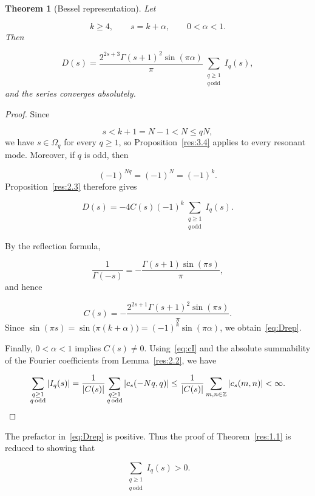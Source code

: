 \documentclass[11pt]{article}
\theoremstyle{plain}
\newtheorem{theorem}{Theorem}[section]
\theoremstyle{definition}
\theoremstyle{remark}
\begin{document}
\begin{theorem}[Bessel representation]\label{res:3.5}
Let

\[
  k \ge 4, \qquad  s = k + \alpha , \qquad  0 < \alpha < 1 .
\]
Then

\begin{equation}\label{eq:Drep}
  D(s) = \frac{2^{2s+3}\Gamma (s+1)^{2}\sin (\pi \alpha )}{\pi } \sum_{\substack{q \ge 1 \\ q \,\mathrm{odd}}} I_q(s) ,
\end{equation}
and the series converges absolutely.
\end{theorem}

\begin{proof}
Since

\[
  s < k+1 = N-1 < N \le qN ,
\]
we have $s \in \Omega_q$ for every $q \ge 1$, so Proposition~\ref{res:3.4} applies to every resonant mode. Moreover, if $q$ is odd, then

\[
  (-1)^{Nq} = (-1)^{N} = (-1)^{k} .
\]
Proposition~\ref{res:2.3} therefore gives

\[
  D(s) = -4C(s)(-1)^{k} \sum_{\substack{q \ge 1 \\ q \,\mathrm{odd}}} I_q(s) .
\]

By the reflection formula,

\[
  \frac{1}{\Gamma (-s)} = -\frac{\Gamma (s+1)\sin (\pi s)}{\pi } ,
\]
and hence

\[
  C(s) = -\frac{2^{2s+1}\Gamma (s+1)^{2}\sin (\pi s)}{\pi } .
\]
Since $\sin (\pi s) = \sin \big( \pi (k+\alpha ) \big) = (-1)^{k}\sin (\pi \alpha )$, we obtain~\eqref{eq:Drep}.

Finally, $0 < \alpha < 1$ implies $C(s) \ne 0$. Using~\eqref{eq:cI} and the absolute summability of the Fourier coefficients from Lemma~\ref{res:2.2}, we have

\[
  \sum_{\substack{q \ge 1 \\ q \,\mathrm{odd}}} |I_q(s)| = \frac{1}{|C(s)|} \sum_{\substack{q \ge 1 \\ q \,\mathrm{odd}}} |c_s(-Nq, q)| \le \frac{1}{|C(s)|} \sum_{m,n \in \mathbb{Z}} |c_s(m,n)| < \infty . \qedhere
\]
\end{proof}

The prefactor in~\eqref{eq:Drep} is positive. Thus the proof of Theorem~\ref{res:1.1} is reduced to showing that

\begin{equation}\label{eq:target}
  \sum_{\substack{q \ge 1 \\ q \,\mathrm{odd}}} I_q(s) > 0 .
\end{equation}
\end{document}
